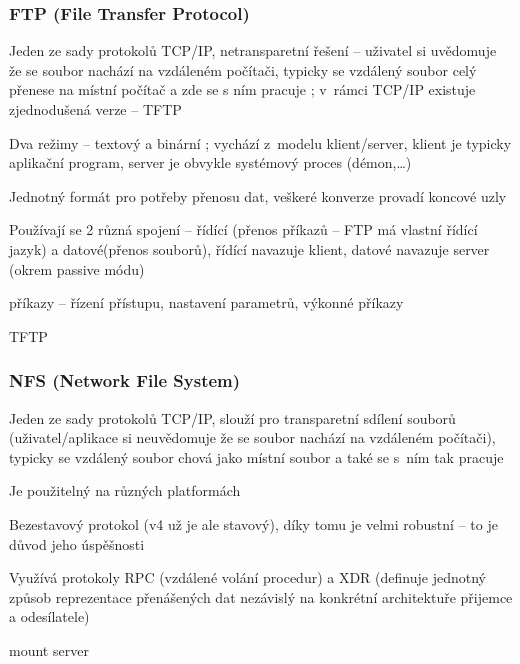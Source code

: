 \subsubsection*{FTP (File Transfer Protocol)}
\begin{pitemize}
	\item Jeden ze sady protokolů TCP/IP, netransparetní řešení – uživatel si uvědomuje že se soubor nachází na vzdáleném počítači, typicky se vzdálený soubor celý přenese na místní počítač a zde se s ním pracuje ; v rámci TCP/IP  existuje zjednodušená verze -- TFTP
	\item Dva režimy – textový a binární ; vychází z modelu klient/server, klient je typicky aplikační program, server je obvykle systémový proces (démon,\dots)
	\item Jednotný formát pro potřeby přenosu dat, veškeré konverze provadí koncové uzly
	\item Používají se 2 různá spojení – řídící (přenos příkazů – FTP má vlastní řídící jazyk) a datové(přenos souborů), řídící navazuje klient, datové navazuje server (okrem passive módu)
	\item příkazy -- řízení přístupu, nastavení parametrů, výkonné příkazy
	\item TFTP 
\end{pitemize}

\subsubsection*{NFS (Network File System)}
\begin{pitemize}
	\item Jeden ze sady protokolů TCP/IP, slouží pro transparetní sdílení souborů (uživatel/aplikace si neuvědomuje že se soubor nachází na vzdáleném počítači), typicky se vzdálený soubor chová  jako místní soubor a také se s ním tak pracuje
	\item Je použitelný na různých platformách
	\item Bezestavový protokol (v4 už je ale stavový), díky tomu je velmi robustní – to je důvod jeho úspěšnosti
	\item Využívá protokoly RPC (vzdálené volání procedur) a XDR (definuje jednotný způsob reprezentace přenášených dat nezávislý na konkrétní architektuře přijemce a odesílatele)
	\item mount server
\end{pitemize}

